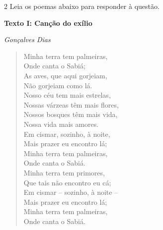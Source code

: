 \num{2} Leia os poemas abaixo para responder à questão. 

\begin{myquote}

\textbf{Texto I: Canção do exílio} 

\emph{Gonçalves Dias}


\begin{verse}

\begin{minipage}{0.5\textwidth}
Minha terra tem palmeiras, \\
Onde canta o Sabiá; \\
As aves, que aqui gorjeiam, \\
Não gorjeiam como lá. \\

Nosso céu tem mais estrelas,\\
Nossas várzeas têm mais flores, \\
Nossos bosques têm mais vida, \\
Nossa vida mais amores. \\

Em cismar, sozinho, à noite, \\
Mais prazer eu encontro lá; \\
Minha terra tem palmeiras, \\
Onde canta o Sabiá. \\

Minha terra tem primores, \\
Que tais não encontro eu cá; \\
Em cismar -- sozinho, à noite -- \\
Mais prazer eu encontro lá; \\
Minha terra tem palmeiras, \\
Onde canta o Sabiá. \\


\end{minipage}
\end{verse}
\end{myquote}
